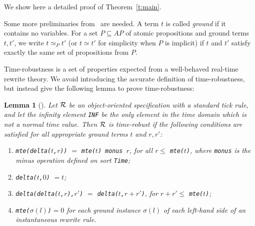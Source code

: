 \documentclass[10pt,journal]{IEEEtran}
\newtheorem{lemma}[theorem]{Lemma}
\begin{document}
{
\label{a:proof}
\setcounter{theorem}{0}
\renewcommand{\thetheorem}{\thesection.\arabic{theorem}}
\newcommand{\lrps}[2]{\rightarrow^{#1}_{#2}}

We show here a detailed proof of Theorem~\ref{t:main}.

Some more preliminaries from~\cite{DBLP:journals/entcs/OlveczkyM07a}
are needed. A term $t$ is called \emph{ground} if it contains no
variables. For a set $P\subseteq AP$ of atomic propositions and ground
terms $t,t'$, we write $t\simeq_P t'$ (or $t\simeq t'$ for simplicity
when $P$ is implicit) if $t$ and $t'$ satisfy exactly the same set of
propositions from $P$.

Time-robustness is a set of properties expected from a well-behaved
real-time rewrite theory. We avoid introducing the accurate definition
of time-robustness, but instead give the following lemma to prove
time-robustness:
\begin{lemma}[\cite{DBLP:journals/entcs/OlveczkyM07a}]
\label{l:timerobustness}
Let $\cal R$ be an object-oriented specification with a standard tick
rule, and let the infinity element \verb|INF| be the only element in
the time domain which is not a normal time value.
Then $\cal R$ is time-robust if the following conditions are satisfied
for all appropriate ground terms $t$ and $r,r'$:
\begin{enumerate}
\item
[(i)] \verb|mte(delta(|$t$\verb|,|$r$\verb|))| $=$
\verb|mte(|$t$\verb|) monus |$r$, for all $r\le$
\verb|mte(|$t$\verb|)|, where \verb|monus| is the minus operation
defined on sort \verb|Time|;

\item
[(ii)] \verb|delta(|$t$\verb|,|$0$\verb|)| $= t$;

\item
[(iii)] \verb|delta(delta(|$t$\verb|,|$r$\verb|),|$r'$\verb|)| $=$
\verb|delta(|$t$\verb|,|$r+r'$\verb|)|, for $r+r'\le$
\verb|mte(|$t$\verb|)|;

\item
[(iv)] \verb|mte(|$\sigma(l)$\verb|)|$= 0$ for each ground instance
$\sigma(l)$ of each left-hand side of an instantaneous rewrite rule.
\end{enumerate}
\end{lemma}

}
\end{document}
